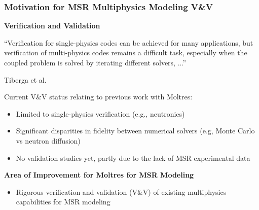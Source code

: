 \begin{frame}[noframenumbering]
  \frametitle{Motivation for MSR Multiphysics Modeling V\&V}
  \textbf{Verification and Validation}

  ``Verification for single-physics codes can be achieved for many applications, but verification
  of multi-physics codes remains a difficult task, especially when the
  coupled problem is solved by iterating different solvers, ...''
  \begin{flushright}
    Tiberga et al. \cite{tiberga_results_2020}
\end{flushright}
  Current V\&V status relating to previous work with Moltres:
  \begin{itemize}
    \item Limited to single-physics verification (e.g., neutronics)
    \item Significant disparities in fidelity between numerical solvers (e.g, Monte Carlo vs
      neutron diffusion)
    \item No validation studies yet, partly due to the lack of MSR experimental data
  \end{itemize}
  \begin{block}{\textbf{Area of Improvement for Moltres for MSR Modeling}}
    \begin{itemize}
      \item Rigorous verification and validation (V\&V) of existing multiphysics capabilities for
        MSR modeling
    \end{itemize}
  \end{block}
\end{frame}

